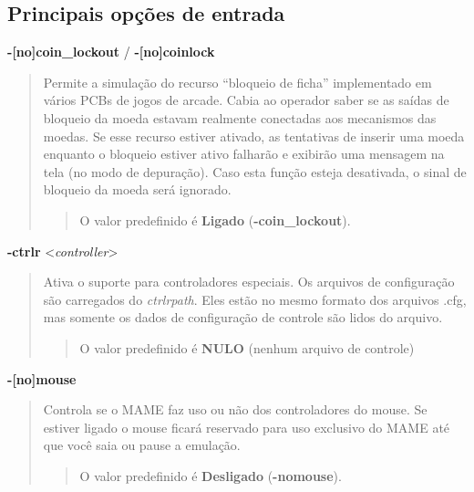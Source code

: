 \documentclass[letterpaper,10pt,brazil]{sphinxmanual}
\begin{document}
\subsection{Principais opções de entrada}
\label{commandline/commandline-all:principais-opcoes-de-entrada}\label{commandline/commandline-all:mame-commandline-nocoinlockout}
\textbf{-{[}no{]}coin\_lockout} / \textbf{-{[}no{]}coinlock}
\begin{quote}

Permite a simulação do recurso ``bloqueio de ficha'' implementado em
vários PCBs de jogos de arcade. Cabia ao operador saber se as saídas
de bloqueio da moeda estavam realmente conectadas aos mecanismos das
moedas. Se esse recurso estiver ativado, as tentativas de inserir
uma moeda enquanto o bloqueio estiver ativo falharão e exibirão uma
mensagem na tela (no modo de depuração). Caso esta função esteja
desativada, o sinal de bloqueio da moeda será ignorado.
\begin{quote}

O valor predefinido é \textbf{Ligado} (\textbf{-coin\_lockout}).
\end{quote}
\end{quote}
\label{commandline/commandline-all:mame-commandline-ctrlr}
\textbf{-ctrlr} \textless{}\emph{controller}\textgreater{}
\begin{quote}

Ativa o suporte para controladores especiais. Os arquivos de
configuração são carregados do \emph{ctrlrpath}. Eles estão no mesmo
formato dos arquivos .cfg, mas somente os dados de configuração de
controle são lidos do arquivo.
\begin{quote}

O valor predefinido é \textbf{NULO} (nenhum arquivo de controle)
\end{quote}
\end{quote}
\label{commandline/commandline-all:mame-commandline-nomouse}
\textbf{-{[}no{]}mouse}
\begin{quote}

Controla se o MAME faz uso ou não dos controladores do mouse.
Se estiver ligado o mouse ficará reservado para uso exclusivo do
MAME até que você saia ou pause a emulação.
\begin{quote}

O valor predefinido é \textbf{Desligado} (\textbf{-nomouse}).
\end{quote}
\end{quote}
\label{commandline/commandline-all:mame-commandline-nojoystick}
\end{document}
